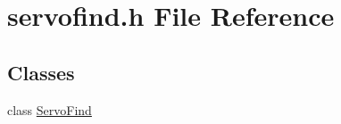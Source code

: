 \hypertarget{a00022}{}\section{servofind.\+h File Reference}
\label{a00022}
\subsection*{Classes}
\begin{DoxyCompactItemize}
\item 
class \hyperlink{a00008}{Servo\+Find}
\end{DoxyCompactItemize}
